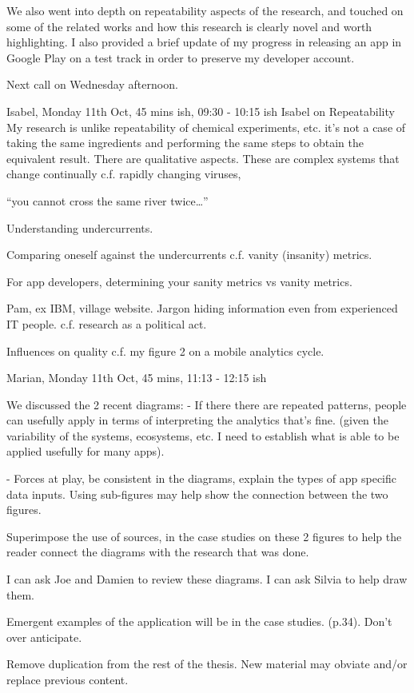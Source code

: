 We also went into depth on repeatability aspects of the research, and touched on some of the related works and how this research is clearly novel and worth highlighting. I also provided a brief update of my progress in releasing an app in Google Play on a test track in order to preserve my developer account. 

Next call on Wednesday afternoon.

\dotfill
Isabel, Monday 11th Oct, 45 mins ish, 09:30 - 10:15 ish
Isabel on Repeatability 
My research is unlike repeatability of chemical experiments, etc. it's not a case of taking the same ingredients and performing the same steps to obtain the equivalent result. There are qualitative aspects. These  are complex systems that change continually c.f. rapidly changing viruses, 

“you cannot cross the same river twice…”


Understanding undercurrents.

Comparing oneself against the undercurrents c.f. vanity (insanity) metrics. 

For app developers, determining your sanity metrics vs vanity metrics.

Pam, ex IBM, village website. Jargon hiding information even from experienced IT people. c.f. research as a political act.

Influences on quality c.f. my figure 2 on a mobile analytics cycle.

\dotfill
Marian, Monday 11th Oct, 45 mins, 11:13 - 12:15 ish

We discussed the 2 recent diagrams:
- If there there are repeated patterns, people can usefully apply in terms of interpreting the analytics that's fine. (given the variability of the systems, ecosystems, etc. I need to establish what is able to be applied usefully for many apps).

- Forces at play, be consistent in the diagrams, explain the types of app specific data inputs. Using sub-figures may help show the connection between the two figures.

Superimpose the use of sources, in the case studies on these 2 figures to help the reader connect the diagrams with the research that was done.

I can ask Joe and Damien to review these diagrams. I can ask Silvia to help draw them.


Emergent examples of the application will be in the case studies. (p.34). Don't over anticipate.

Remove duplication from the rest of the thesis.  New material may obviate and/or replace previous content.

